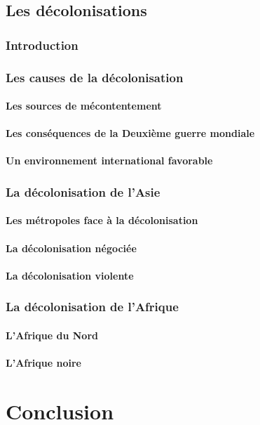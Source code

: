 \documentclass[12pt]{report}
\begin{document}
\chapter{Les décolonisations}

\section*{Introduction}

\section{Les causes de la décolonisation}

\subsection{Les sources de mécontentement}

\subsection{Les conséquences de la Deuxième guerre mondiale}

\subsection{Un environnement international favorable}

\section{La décolonisation de l'Asie}

\subsection{Les métropoles face à la décolonisation}

\subsection{La décolonisation négociée}

\subsection{La décolonisation violente}

\section{La décolonisation de l'Afrique}

\subsection{L'Afrique du Nord}

\subsection{L'Afrique noire}


\part*{Conclusion}
\end{document}
